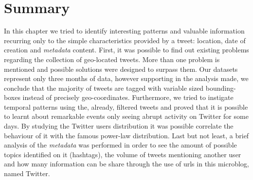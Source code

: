 \begin{table}[htbp]
	\centering
	\caption{Percentage of Metadata composing the datasets}
	\label{tab:metadata}
\end{table}

\section{Summary}
In this chapter we tried to identify interesting patterns and valuable information recurring only to the simple characteristics provided by a tweet: location, date of creation and \textit{metadata} content. First, it was possible to find out existing problems regarding the collection of geo-located tweets. More than one problem is mentioned and possible solutions were designed to surpass them. Our datasets represent only three months of data, however supporting in the analysis made, we conclude that the majority of tweets are tagged with variable sized bounding-boxes instead of precisely geo-coordinates. Furthermore, we tried to instigate temporal patterns using the, already, filtered tweets and proved that it is possible to learnt about remarkable events only seeing abrupt activity on Twitter for some days. By studying the Twitter users distribution it was possible correlate the behaviour of it with the famous power-law distribution. Last but not least, a brief analysis of the \textit{metadata} was performed in order to see the amount of possible topics identified on it (hashtags), the volume of tweets mentioning another user and how many information can be share through the use of urls in this microblog, named Twitter.